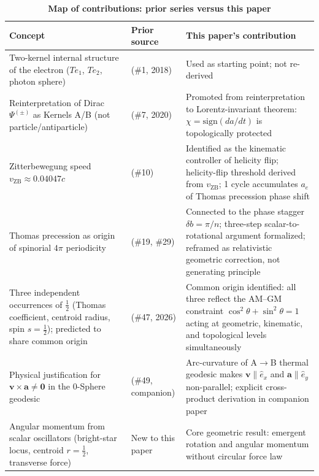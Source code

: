 \documentclass[%
 reprint, amsmath,amssymb, aps, prb, ]{revtex4-2}
\numberwithin{equation}{section}
\newcommand{\iphase}{\theta}
\begin{document}
\begin{table}[t!]
\centering
\caption{\textbf{Map of contributions: prior series versus this paper}}
\label{tab:contributions}
\renewcommand{\arraystretch}{1.4}
\begin{tabular}{p{6.2cm}p{3.8cm}p{6.5cm}}
\toprule
\textbf{Concept} & \textbf{Prior source} & \textbf{This paper's contribution} \\
\midrule
Two-kernel internal structure of the electron ($Te_1$, $Te_2$, photon sphere)
& \cite{hanamura01} (\#1, 2018)
& Used as starting point; not re-derived \\
\addlinespace[0.3cm]
Reinterpretation of Dirac $\Psi^{(\pm)}$ as Kernels A/B (not particle/antiparticle)
& \cite{hanamura07} (\#7, 2020)
& Promoted from reinterpretation to Lorentz-invariant theorem: $\chi = \mathrm{sign}(da/dt)$ is topologically protected \\
\addlinespace[0.3cm]
Zitterbewegung speed $v_\mathrm{ZB} \approx 0.04047c$
& \cite{hanamura10} (\#10)
& Identified as the kinematic controller of helicity flip; helicity-flip threshold derived from $v_\mathrm{ZB}$; 1 cycle accumulates $a_e$ of Thomas precession phase shift \\
\addlinespace[0.3cm]
Thomas precession as origin of spinorial $4\pi$ periodicity
& \cite{hanamura19, hanamura29} (\#19, \#29)
& Connected to the phase stagger $\delta b = \pi/n$; three-step scalar-to-rotational argument formalized; reframed as relativistic geometric correction, not generating principle \\
\addlinespace[0.3cm]
Three independent occurrences of $\tfrac{1}{2}$ (Thomas coefficient, centroid radius, spin $s=\tfrac{1}{2}$); predicted to share common origin
& \cite{hanamura47} (\#47, 2026)
& Common origin identified: all three reflect the AM--GM constraint $\cos^2\iphase + \sin^2\iphase = 1$ acting at geometric, kinematic, and topological levels simultaneously \\
\addlinespace[0.3cm]
Physical justification for $\mathbf{v}\times\mathbf{a}\neq\mathbf{0}$ in the 0-Sphere geodesic
& \cite{hanamura49} (\#49, companion)
& Arc-curvature of A$\to$B thermal geodesic makes $\mathbf{v}\parallel\hat{e}_x$ and $\mathbf{a}\parallel\hat{e}_y$ non-parallel; explicit cross-product derivation in companion paper \\
\addlinespace[0.3cm]
Angular momentum from scalar oscillators (bright-star locus, centroid $r=\tfrac{1}{2}$, transverse force)
& New to this paper
& Core geometric result: emergent rotation and angular momentum without circular force law \\

\end{tabular}
\end{table}
\end{document}
